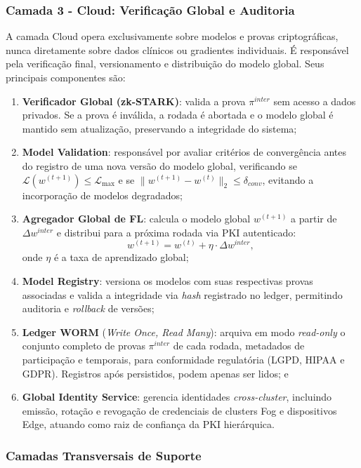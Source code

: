 \documentclass[12pt]{article}
\begin{document}
\subsubsection{Camada 3 - Cloud: Verificação Global e Auditoria}

A camada Cloud opera exclusivamente sobre modelos e provas criptográficas, nunca diretamente sobre dados clínicos ou gradientes individuais. É responsável pela verificação final, versionamento e distribuição do modelo global. Seus principais componentes são:

\begin{enumerate}
    \item \textbf{Verificador Global (zk-STARK)}: valida a prova $\pi^{inter}$ sem acesso a dados privados. Se a prova é inválida, a rodada é abortada e o modelo global é mantido sem atualização, preservando a integridade do sistema;
    \item \textbf{Model Validation}: responsável por avaliar critérios de convergência antes do registro de uma nova versão do modelo global, verificando se $\mathcal{L}(w^{(t+1)}) \leq \mathcal{L}_{\max}$  e se  $\|w^{(t+1)} - w^{(t)}\|_2 \leq \delta_{conv}$, evitando a incorporação de modelos degradados;
    \item \textbf{Agregador Global de FL}: calcula o modelo global $w^{(t+1)}$ a partir de $\Delta w^{{inter}}$ e distribui para a próxima rodada via PKI autenticado:
    \[
    w^{(t+1)} = w^{(t)} + \eta \cdot \Delta w^{{inter}},
    \]
    onde $\eta$ é a taxa de aprendizado global;
    \item \textbf{Model Registry}: versiona os modelos com suas respectivas provas associadas e valida a integridade via \textit{hash} registrado no ledger, permitindo auditoria e \textit{rollback} de versões;
    \item \textbf{Ledger WORM} (\textit{Write Once, Read Many}): arquiva em modo \textit{read-only} o conjunto completo de provas $\pi^{{inter}}$ de cada rodada, metadados de participação e temporais, para conformidade regulatória (LGPD, HIPAA e GDPR). Registros após persistidos, podem apenas ser lidos; e
    \item \textbf{Global Identity Service}: gerencia identidades \textit{cross-cluster}, incluindo emissão, rotação e revogação de credenciais de clusters Fog e dispositivos Edge, atuando como raiz de confiança da PKI hierárquica. 
\end{enumerate}

\subsubsection{Camadas Transversais de Suporte}
\end{document}
